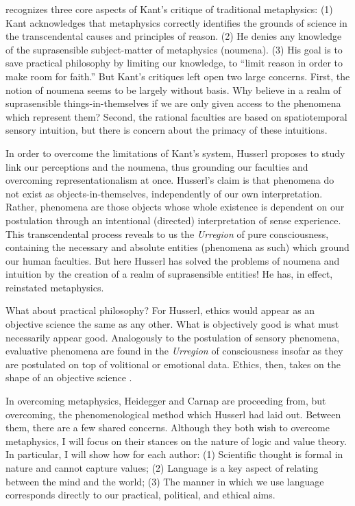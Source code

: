 \documentclass[leqno, 12pt]{turabian-researchpaper}
\begin{document}
	\autocite{stone2017} recognizes three core aspects of Kant's critique of
	traditional metaphysics: (1) Kant acknowledges that metaphysics correctly identifies
	the grounds of science in the transcendental causes and principles of reason.
	(2) He denies any knowledge of the suprasensible subject-matter of metaphysics
	(noumena). (3) His goal is to save practical philosophy by limiting our knowledge,
	to \enquote{limit reason in order to make room for faith.} But Kant's critiques
	left open two large concerns. First, the notion of noumena seems to be largely
	without basis. Why believe in a realm of suprasensible things-in-themselves if
	we are only given access to the phenomena which represent them? Second, the
	rational faculties are based on spatiotemporal sensory intuition, but there is
	concern about the primacy of these intuitions.

	In order to overcome the limitations of Kant's system, Husserl proposes to
	study link our perceptions and the noumena, thus grounding our faculties and overcoming
	representationalism at once. Husserl's claim is that phenomena do not exist as
	objects-in-themselves, independently of our own interpretation. Rather, phenomena
	are those objects whose whole existence is dependent on our postulation through
	an intentional (directed) interpretation of sense experience. This
	transcendental process reveals to us the \textit{Urregion} of pure consciousness,
	containing the necessary and absolute entities (phenomena as such) which
	ground our human faculties. But here Husserl has solved the problems of noumena
	and intuition by the creation of a realm of suprasensible entities! He has, in
	effect, reinstated metaphysics. \autocite[4f]{stone2017}

	What about practical philosophy? For Husserl, ethics would appear as an
	objective science the same as any other. What is objectively good is what must
	necessarily appear good. Analogously to the postulation of sensory phenomena, evaluative
	phenomena are found in the \textit{Urregion} of consciousness insofar as they
	are postulated on top of volitional or emotional data. Ethics, then, takes on the
	shape of an objective science \autocite[5]{stone2017}.

	In overcoming metaphysics, Heidegger and Carnap are proceeding from, but overcoming,
	the phenomenological method which Husserl had laid out. Between them, there
	are a few shared concerns. Although they both wish to overcome metaphysics, I
	will focus on their stances on the nature of logic and value theory. In particular,
	I will show how for each author: (1) Scientific thought is formal in nature and
	cannot capture values; (2) Language is a key aspect of relating between the
	mind and the world; (3) The manner in which we use language corresponds directly
	to our practical, political, and ethical aims.
\end{document}
